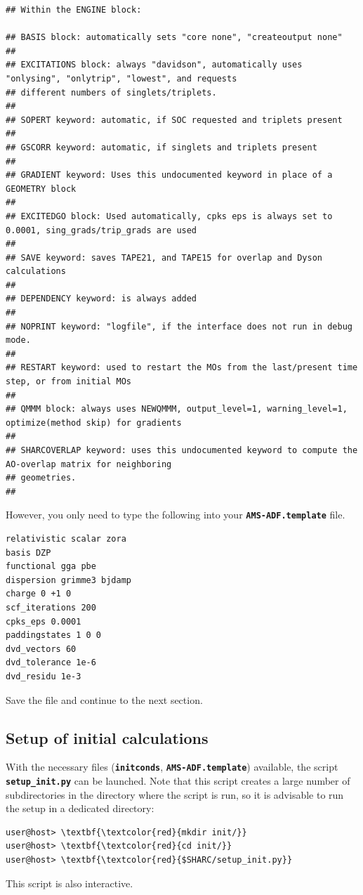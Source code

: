 \documentclass[a4paper,11pt,DIV=15,openany]{scrbook}
\makeatletter
\newcommand{\refermanual}[2][rectangle,draw=B,thick,fill=black!5,inner sep=1pt,outer sep=0pt,rounded corners]{\marginpar{\tikz[baseline=(current bounding box.north)]\node at (0,0) [#1]{\begin{tabular}{@{}l@{}}See\\ section\\ \ref*{#2}\\ (p. \pageref*{#2})\\ in the\\ manual.\end{tabular}};}}
\newcommand{\ttt}[1]{\textbf{\texttt{#1}}}
\makeatother
\begin{document}
\begin{oframed}
\begin{Verbatim}[commandchars=\\\{\}]
## Within the ENGINE block:

## BASIS block: automatically sets "core none", "createoutput none"
##
## EXCITATIONS block: always "davidson", automatically uses "onlysing", "onlytrip", "lowest", and requests 
## different numbers of singlets/triplets.
##
## SOPERT keyword: automatic, if SOC requested and triplets present
##
## GSCORR keyword: automatic, if singlets and triplets present
##
## GRADIENT keyword: Uses this undocumented keyword in place of a GEOMETRY block
##
## EXCITEDGO block: Used automatically, cpks eps is always set to 0.0001, sing_grads/trip_grads are used 
##
## SAVE keyword: saves TAPE21, and TAPE15 for overlap and Dyson calculations
##
## DEPENDENCY keyword: is always added
##
## NOPRINT keyword: "logfile", if the interface does not run in debug mode.
##
## RESTART keyword: used to restart the MOs from the last/present time step, or from initial MOs
##
## QMMM block: always uses NEWQMMM, output_level=1, warning_level=1, optimize(method skip) for gradients
##
## SHARCOVERLAP keyword: uses this undocumented keyword to compute the AO-overlap matrix for neighboring 
## geometries.
##
\end{Verbatim}
\end{oframed}

However, you only need to type the following into your \ttt{AMS-ADF.template} file.
\begin{oframed}
  \begin{Verbatim}[commandchars=\\\{\}]
relativistic scalar zora 
basis DZP
functional gga pbe
dispersion grimme3 bjdamp
charge 0 +1 0
scf_iterations 200
cpks_eps 0.0001
paddingstates 1 0 0
dvd_vectors 60
dvd_tolerance 1e-6
dvd_residu 1e-3
  \end{Verbatim}
\end{oframed}

\normalsize
Save the file and continue to the next section.

\clearpage
\subsection{Setup of initial calculations}
\refermanual{m-sec:molcas_input.py}

With the necessary files (\ttt{initconds}, \ttt{AMS-ADF.template}) available, the script \ttt{setup\_init.py} can be launched.
Note that this script creates a large number of subdirectories in the directory where the script is run, so it is advisable to run the setup in a dedicated directory:
\begin{Verbatim}[commandchars=\\\{\}]
user@host> \textbf{\textcolor{red}{mkdir init/}}
user@host> \textbf{\textcolor{red}{cd init/}}
user@host> \textbf{\textcolor{red}{$SHARC/setup_init.py}}
\end{Verbatim}
This script is also interactive. 
\end{document}
